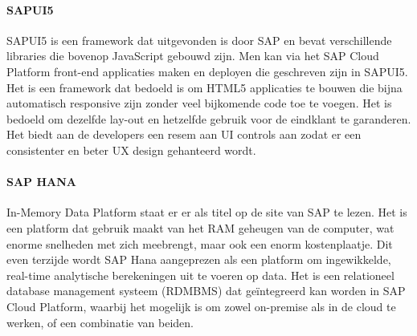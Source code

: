     \paragraph{SAPUI5}
    SAPUI5 is een framework dat uitgevonden is door SAP en bevat verschillende libraries die bovenop JavaScript gebouwd zijn. Men kan via het SAP Cloud Platform front-end applicaties maken en deployen die geschreven zijn in SAPUI5. Het is een framework dat bedoeld is om HTML5 applicaties te bouwen die bijna automatisch responsive zijn zonder veel bijkomende code toe te voegen.
    Het is bedoeld om dezelfde lay-out en hetzelfde gebruik voor de eindklant te garanderen. Het biedt aan de developers een resem aan UI controls aan zodat er een consistenter en beter UX design gehanteerd wordt.~\autocite{SAPSEa} 
    
    \paragraph{SAP HANA}
    In-Memory Data Platform staat er er als titel op de site van SAP te lezen. Het is een platform dat gebruik maakt van het RAM geheugen van de computer, wat enorme snelheden met zich meebrengt, maar ook een enorm kostenplaatje. Dit even terzijde wordt SAP Hana aangeprezen als een platform  om ingewikkelde, real-time analytische berekeningen uit te voeren op data.
    Het is een relationeel database management systeem (RDMBMS) dat geïntegreerd kan worden in SAP Cloud Platform, waarbij het mogelijk is om zowel on-premise als in de cloud te werken, of een combinatie van beiden.

